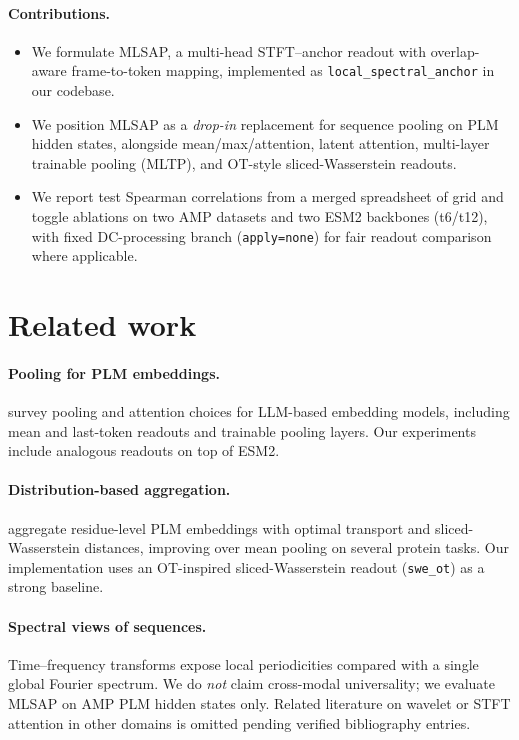\documentclass[11pt]{article}
\newcommand{\method}{MLSAP}
\begin{document}
\paragraph{Contributions.}
\begin{itemize}
  \item We formulate \method{}, a multi-head STFT--anchor readout with overlap-aware frame-to-token mapping, implemented as \texttt{local\_spectral\_anchor} in our codebase.
  \item We position \method{} as a \emph{drop-in} replacement for sequence pooling on PLM hidden states, alongside mean/max/attention, latent attention, multi-layer trainable pooling (MLTP), and OT-style sliced-Wasserstein readouts.
  \item We report test Spearman correlations from a merged spreadsheet of grid and toggle ablations on two AMP datasets and two ESM2 backbones (t6/t12), with fixed DC-processing branch (\texttt{apply=none}) for fair readout comparison where applicable.
\end{itemize}

\section{Related work}
\paragraph{Pooling for PLM embeddings.}
\citet{tang2024poolingattentioneffectivedesigns} survey pooling and attention choices for LLM-based embedding models, including mean and last-token readouts and trainable pooling layers.
Our experiments include analogous readouts on top of ESM2.

\paragraph{Distribution-based aggregation.}
\citet{naderi2024aggregating} aggregate residue-level PLM embeddings with optimal transport and sliced-Wasserstein distances, improving over mean pooling on several protein tasks.
Our implementation uses an OT-inspired sliced-Wasserstein readout (\texttt{swe\_ot}) as a strong baseline.

\paragraph{Spectral views of sequences.}
Time--frequency transforms expose local periodicities compared with a single global Fourier spectrum.
We do \emph{not} claim cross-modal universality; we evaluate \method{} on AMP PLM hidden states only.
Related literature on wavelet or STFT attention in other domains is omitted pending verified bibliography entries.
\end{document}
